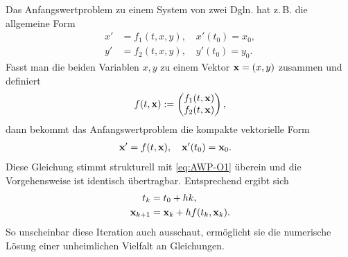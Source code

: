 Das Anfangswertproblem zu einem System von zwei Dgln. hat
z.\,B. die allgemeine Form
\begin{equation}
\begin{split}
x' &= f_1(t,x,y),\quad x'(t_0)=x_0,\\
y' &= f_2(t,x,y),\quad y'(t_0)=y_0.
\end{split}
\end{equation}
Fasst man die beiden Variablen $x,y$ zu einem Vektor
$\mathbf{x} = (x,y)$ zusammen und definiert
\begin{equation}
f(t,\mathbf{x}) := \begin{pmatrix}
f_1(t,\mathbf{x})\\
f_2(t,\mathbf{x})
\end{pmatrix},
\end{equation}
dann bekommt das Anfangswertproblem die kompakte
vektorielle Form
\begin{equation}
\begin{split}
\mathbf{x}' &= f(t,\mathbf{x}),\quad \mathbf{x}'(t_0)=\mathbf{x}_0.
\end{split}
\end{equation}
Diese Gleichung stimmt strukturell mit \eqref{eq:AWP-O1} überein
und die Vorgehensweise ist identisch übertragbar. Entsprechend ergibt
sich
\begin{align}
t_{k} &= t_0+hk,\\
\mathbf{x}_{k+1} &= \mathbf{x}_k+hf(t_k,\mathbf{x}_k).
\end{align}
So unscheinbar diese Iteration auch ausschaut, ermöglicht sie die
numerische Lösung einer unheimlichen Vielfalt an Gleichungen.


